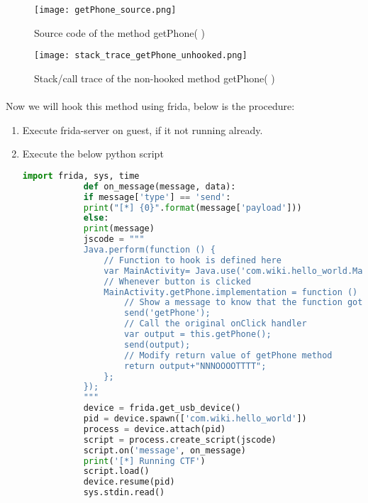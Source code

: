 \documentclass[../main.tex]{subfile}
\begin{document}
	\begin{figure}
		\texttt{[image: getPhone\_source.png]}
		\caption{Source code of the method getPhone( )}
		\label{fig:getPhone_source}
	\end{figure}
	
	\begin{figure}
		\texttt{[image: stack\_trace\_getPhone\_unhooked.png]}
		\caption{Stack/call trace of the non-hooked method getPhone( )}
		\label{fig:getPhone_trace}
	\end{figure}
	
	
	\paragraph{} Now we will hook this method using frida, below is the procedure:
	\begin{enumerate}
		\item Execute frida-server on guest, if it not running already.
		\item Execute the below python script
		\begin{lstlisting}[language=python]
			import frida, sys, time
			def on_message(message, data):
			if message['type'] == 'send':
			print("[*] {0}".format(message['payload']))
			else:
			print(message)
			jscode = """
			Java.perform(function () {
				// Function to hook is defined here
				var MainActivity= Java.use('com.wiki.hello_world.MainActivity');
				// Whenever button is clicked
				MainActivity.getPhone.implementation = function () {
					// Show a message to know that the function got called
					send('getPhone');
					// Call the original onClick handler
					var output = this.getPhone();
					send(output);
					// Modify return value of getPhone method
					return output+"NNNOOOOTTTT";
				};
			});
			"""
			device = frida.get_usb_device()
			pid = device.spawn(['com.wiki.hello_world'])
			process = device.attach(pid)
			script = process.create_script(jscode)
			script.on('message', on_message)
			print('[*] Running CTF')
			script.load()
			device.resume(pid)
			sys.stdin.read()
		\end{lstlisting}
	\end{enumerate}
\end{document}

